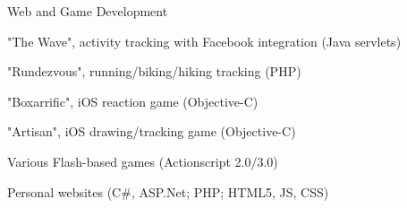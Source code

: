 \boldfont Web and Game Development
\lightfont
\begin{squarelist}
	\item "The Wave", activity tracking with Facebook integration (Java servlets)
	\item "Rundezvous", running/biking/hiking tracking (PHP)
	\item "Boxarrific", iOS reaction game (Objective-C)
	\item "Artisan", iOS drawing/tracking game (Objective-C)
	\item Various Flash-based games (Actionscript 2.0/3.0)
	\item Personal websites (C\#, ASP.Net; PHP; HTML5, JS, CSS)
\end{squarelist}
